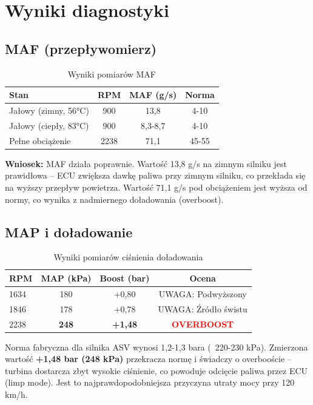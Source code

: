 \documentclass[12pt,a4paper]{article}
\begin{document}
\section{Wyniki diagnostyki}

\subsection{MAF (przepływomierz)}

\begin{table}[h]
\centering
\begin{tabular}{lccc}
\toprule
\textbf{Stan} & \textbf{RPM} & \textbf{MAF (g/s)} & \textbf{Norma} \\
\midrule
Jałowy (zimny, 56°C) & 900 & 13,8 & 4-10 \\
Jałowy (ciepły, 83°C) & 900 & 8,3-8,7 & 4-10 \\
Pełne obciążenie & 2238 & 71,1 & 45-55 \\
\bottomrule
\end{tabular}
\caption{Wyniki pomiarów MAF}
\end{table}

\textbf{Wniosek:} MAF działa poprawnie. Wartość 13,8 g/s na zimnym silniku jest
prawidłowa – ECU zwiększa dawkę paliwa przy zimnym silniku, co przekłada się na
wyższy przepływ powietrza. Wartość 71,1 g/s pod obciążeniem jest wyższa od normy,
co wynika z nadmiernego doładowania (overboost).

\subsection{MAP i doładowanie}

\begin{table}[h]
\centering
\begin{tabular}{lccc}
\toprule
\textbf{RPM} & \textbf{MAP (kPa)} & \textbf{Boost (bar)} & \textbf{Ocena} \\
\midrule
1634 & 180 & +0,80 & UWAGA:  Podwyższony \\
1846 & 178 & +0,78 & UWAGA:  Źródło świstu \\
2238 & \textbf{248} & \textbf{+1,48} & \textcolor{red}{\textbf{OVERBOOST}} \\
\bottomrule
\end{tabular}
\caption{Wyniki pomiarów ciśnienia doładowania}
\end{table}

Norma fabryczna dla silnika ASV wynosi 1,2-1,3 bara (~220-230 kPa).
Zmierzona wartość \textbf{+1,48 bar (248 kPa)} przekracza normę i świadczy
o overbooście – turbina dostarcza zbyt wysokie ciśnienie, co powoduje
odcięcie paliwa przez ECU (limp mode). Jest to najprawdopodobniejsza
przyczyna utraty mocy przy 120 km/h.
\end{document}

